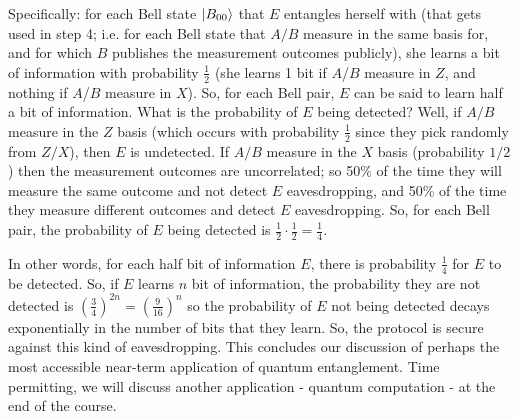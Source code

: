 Specifically: for each Bell state $\lvert B_{00} \rangle$ that $E$ entangles herself with (that gets used in step 4; i.e. for each Bell state that $A/B$ measure in the same basis for, and for which $B$ publishes the measurement outcomes publicly), she learns a bit of information with probability $\frac{1}{2}$ (she learns 1 bit if $A$/$B$ measure in $Z$, and nothing if $A$/$B$ measure in $X$). So, for each Bell pair, $E$ can be said to learn half a bit of information. What is the probability of $E$ being detected? Well, if $A/B$ measure in the $Z$ basis (which occurs with probability $\frac{1}{2}$ since they pick randomly from $Z/X$), then $E$ is undetected. If $A/B$ measure in the $X$ basis (probability $1/2$) then the measurement outcomes are uncorrelated; so 50\% of the time they will measure the same outcome and not detect $E$ eavesdropping, and 50\% of the time they measure different outcomes and detect $E$ eavesdropping. So, for each Bell pair, the probability of $E$ being detected is $\frac{1}{2} \cdot \frac{1}{2} = \frac{1}{4}$.

In other words, for each half bit of information $E$, there is probability $\frac{1}{4}$ for $E$ to be detected. So, if $E$ learns $n$ bit of information, the probability they are not detected is $\left(\frac{3}{4}\right)^{2n} = \left(\frac{9}{16}\right)^{n}$ so the probability of $E$ not being detected decays exponentially in the number of bits that they learn. So, the protocol is secure against this kind of eavesdropping. This concludes our discussion of perhaps the most accessible near-term application of quantum entanglement. Time permitting, we will discuss another application - quantum computation - at the end of the course.

